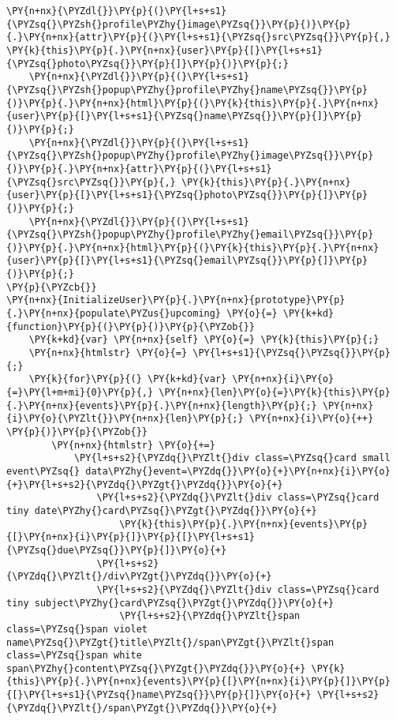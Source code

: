 \begin{Verbatim}[commandchars=\\\{\}]
    \PY{n+nx}{\PYZdl{}}\PY{p}{(}\PY{l+s+s1}{\PYZsq{}\PYZsh{}profile\PYZhy{}image\PYZsq{}}\PY{p}{)}\PY{p}{.}\PY{n+nx}{attr}\PY{p}{(}\PY{l+s+s1}{\PYZsq{}src\PYZsq{}}\PY{p}{,} \PY{k}{this}\PY{p}{.}\PY{n+nx}{user}\PY{p}{[}\PY{l+s+s1}{\PYZsq{}photo\PYZsq{}}\PY{p}{]}\PY{p}{)}\PY{p}{;}
    \PY{n+nx}{\PYZdl{}}\PY{p}{(}\PY{l+s+s1}{\PYZsq{}\PYZsh{}popup\PYZhy{}profile\PYZhy{}name\PYZsq{}}\PY{p}{)}\PY{p}{.}\PY{n+nx}{html}\PY{p}{(}\PY{k}{this}\PY{p}{.}\PY{n+nx}{user}\PY{p}{[}\PY{l+s+s1}{\PYZsq{}name\PYZsq{}}\PY{p}{]}\PY{p}{)}\PY{p}{;}
    \PY{n+nx}{\PYZdl{}}\PY{p}{(}\PY{l+s+s1}{\PYZsq{}\PYZsh{}popup\PYZhy{}profile\PYZhy{}image\PYZsq{}}\PY{p}{)}\PY{p}{.}\PY{n+nx}{attr}\PY{p}{(}\PY{l+s+s1}{\PYZsq{}src\PYZsq{}}\PY{p}{,} \PY{k}{this}\PY{p}{.}\PY{n+nx}{user}\PY{p}{[}\PY{l+s+s1}{\PYZsq{}photo\PYZsq{}}\PY{p}{]}\PY{p}{)}\PY{p}{;}
    \PY{n+nx}{\PYZdl{}}\PY{p}{(}\PY{l+s+s1}{\PYZsq{}\PYZsh{}popup\PYZhy{}profile\PYZhy{}email\PYZsq{}}\PY{p}{)}\PY{p}{.}\PY{n+nx}{html}\PY{p}{(}\PY{k}{this}\PY{p}{.}\PY{n+nx}{user}\PY{p}{[}\PY{l+s+s1}{\PYZsq{}email\PYZsq{}}\PY{p}{]}\PY{p}{)}\PY{p}{;}
\PY{p}{\PYZcb{}}
\PY{n+nx}{InitializeUser}\PY{p}{.}\PY{n+nx}{prototype}\PY{p}{.}\PY{n+nx}{populate\PYZus{}upcoming} \PY{o}{=} \PY{k+kd}{function}\PY{p}{(}\PY{p}{)}\PY{p}{\PYZob{}}
    \PY{k+kd}{var} \PY{n+nx}{self} \PY{o}{=} \PY{k}{this}\PY{p}{;}
    \PY{n+nx}{htmlstr} \PY{o}{=} \PY{l+s+s1}{\PYZsq{}\PYZsq{}}\PY{p}{;}
    \PY{k}{for}\PY{p}{(} \PY{k+kd}{var} \PY{n+nx}{i}\PY{o}{=}\PY{l+m+mi}{0}\PY{p}{,} \PY{n+nx}{len}\PY{o}{=}\PY{k}{this}\PY{p}{.}\PY{n+nx}{events}\PY{p}{.}\PY{n+nx}{length}\PY{p}{;} \PY{n+nx}{i}\PY{o}{\PYZlt{}}\PY{n+nx}{len}\PY{p}{;} \PY{n+nx}{i}\PY{o}{++} \PY{p}{)}\PY{p}{\PYZob{}}
        \PY{n+nx}{htmlstr} \PY{o}{+=}
            \PY{l+s+s2}{\PYZdq{}\PYZlt{}div class=\PYZsq{}card small event\PYZsq{} data\PYZhy{}event=\PYZdq{}}\PY{o}{+}\PY{n+nx}{i}\PY{o}{+}\PY{l+s+s2}{\PYZdq{}\PYZgt{}\PYZdq{}}\PY{o}{+}
                \PY{l+s+s2}{\PYZdq{}\PYZlt{}div class=\PYZsq{}card tiny date\PYZhy{}card\PYZsq{}\PYZgt{}\PYZdq{}}\PY{o}{+}
                    \PY{k}{this}\PY{p}{.}\PY{n+nx}{events}\PY{p}{[}\PY{n+nx}{i}\PY{p}{]}\PY{p}{[}\PY{l+s+s1}{\PYZsq{}due\PYZsq{}}\PY{p}{]}\PY{o}{+}
                \PY{l+s+s2}{\PYZdq{}\PYZlt{}/div\PYZgt{}\PYZdq{}}\PY{o}{+}
                \PY{l+s+s2}{\PYZdq{}\PYZlt{}div class=\PYZsq{}card tiny subject\PYZhy{}card\PYZsq{}\PYZgt{}\PYZdq{}}\PY{o}{+}
                    \PY{l+s+s2}{\PYZdq{}\PYZlt{}span class=\PYZsq{}span violet name\PYZsq{}\PYZgt{}title\PYZlt{}/span\PYZgt{}\PYZlt{}span class=\PYZsq{}span white span\PYZhy{}content\PYZsq{}\PYZgt{}\PYZdq{}}\PY{o}{+} \PY{k}{this}\PY{p}{.}\PY{n+nx}{events}\PY{p}{[}\PY{n+nx}{i}\PY{p}{]}\PY{p}{[}\PY{l+s+s1}{\PYZsq{}name\PYZsq{}}\PY{p}{]}\PY{o}{+} \PY{l+s+s2}{\PYZdq{}\PYZlt{}/span\PYZgt{}\PYZdq{}}\PY{o}{+}

\end{Verbatim}
